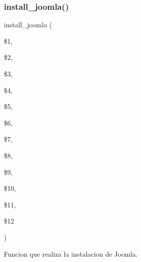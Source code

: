 \subsubsection{\texorpdfstring{install\+\_\+joomla()}{install\_joomla()}}
{\footnotesize\ttfamily install\+\_\+joomla (\begin{DoxyParamCaption}\item[{}]{\$1,  }\item[{}]{\$2,  }\item[{}]{\$3,  }\item[{}]{\$4,  }\item[{}]{\$5,  }\item[{}]{\$6,  }\item[{}]{\$7,  }\item[{}]{\$8,  }\item[{}]{\$9,  }\item[{}]{\$10,  }\item[{}]{\$11,  }\item[{}]{\$12 }\end{DoxyParamCaption})}



Funcion que realiza la instalacion de Joomla. 


